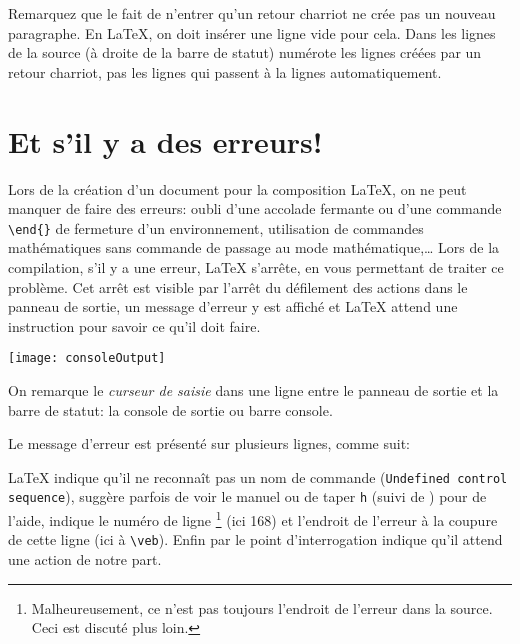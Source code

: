 Remarquez que le fait de n'entrer qu'un retour charriot ne crée pas un nouveau paragraphe. En \LaTeX, on doit insérer une ligne vide pour cela. Dans \Tw{} les lignes de la source (à droite de la barre de statut) numérote les lignes créées par un retour charriot, pas les lignes qui passent à la lignes automatiquement.

\section{Et s'il y a des erreurs!}

Lors de la création d'un document pour la composition \LaTeX, on ne peut manquer de faire des erreurs: oubli d'une accolade fermante ou d'une commande \verb+\end{}+ de fermeture d'un environnement, utilisation de commandes mathématiques sans commande de passage au mode mathématique,\dots{} Lors de la compilation, s'il y a une erreur, \LaTeX{} s'arrête, en vous permettant de traiter ce problème. Cet arrêt est visible par l'arrêt du défilement des actions dans le panneau de sortie, un message d'erreur y est affiché et \LaTeX{} attend une instruction pour savoir ce qu'il doit faire.

\begin{center}\label{fig:consoleOutput}
\texttt{[image: consoleOutput]}%
\end{center}

On remarque le \emph{curseur de saisie} dans une ligne entre le panneau de sortie et la barre de statut: la console de sortie ou barre console.

Le message d'erreur est présenté sur plusieurs lignes, comme suit:
\smallskip


\LaTeX{} indique qu'il ne reconnaît pas un nom de commande (\texttt{Undefined control sequence}), suggère parfois de voir le manuel ou de taper \verb=h= (suivi de \Return) pour de l'aide, indique le numéro de ligne \footnote{Malheureusement, ce n'est pas toujours l'endroit de l'erreur dans la source. Ceci est discuté plus loin.} (ici 168) et l'endroit de l'erreur à la coupure de cette ligne (ici à \verb+\veb+). Enfin par le point d'interrogation indique qu'il attend une action de notre part.

